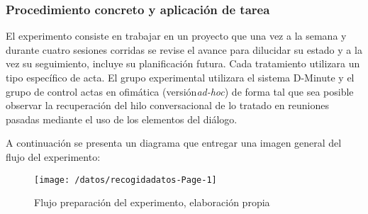 \subsubsection{Procedimiento concreto y aplicación de tarea}

El experimento consiste en trabajar en un proyecto que una vez a la semana y durante cuatro sesiones corridas se revise el avance para dilucidar su estado y a la vez su seguimiento, incluye su planificación futura. Cada tratamiento utilizara un tipo específico de acta. El grupo experimental utilizara el sistema D-Minute y el grupo de control actas en ofimática (versión\textit{ad-hoc}) de forma tal que sea posible observar la recuperación del hilo conversacional de lo tratado en reuniones pasadas mediante el uso de los elementos del diálogo. 

A continuación se presenta un diagrama que entregar una imagen general del flujo del experimento:

\begin{figure}[!h]
\centering
\texttt{[image: /datos/recogidadatos-Page-1]}
\caption{Flujo preparación del experimento,  elaboración propia} 
\label{img5-2}
\end{figure}

